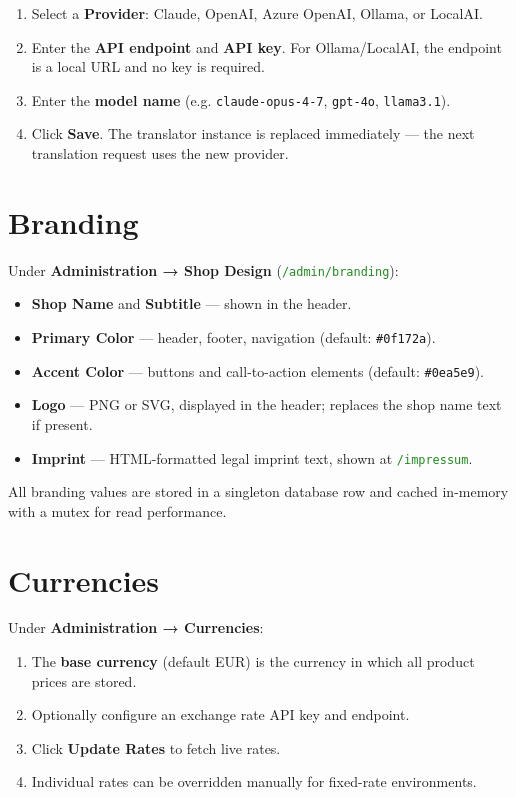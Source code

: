 \documentclass[12pt,a4paper,twoside]{report}
\newcommand{\code}[1]{\texttt{#1}}
\newcommand{\route}[1]{\texttt{\textcolor{ForestGreen}{#1}}}
\begin{document}
\begin{enumerate}
  \item Select a \textbf{Provider}: Claude, OpenAI, Azure OpenAI,
        Ollama, or LocalAI.
  \item Enter the \textbf{API endpoint} and \textbf{API key}.
        For Ollama/LocalAI, the endpoint is a local URL and no key
        is required.
  \item Enter the \textbf{model name} (e.g. \code{claude-opus-4-7},
        \code{gpt-4o}, \code{llama3.1}).
  \item Click \textbf{Save}. The translator instance is replaced
        immediately — the next translation request uses the new provider.
\end{enumerate}

\section{Branding}
\label{sec:branding}

Under \textbf{Administration → Shop Design} (\route{/admin/branding}):

\begin{itemize}
  \item \textbf{Shop Name} and \textbf{Subtitle} — shown in the header.
  \item \textbf{Primary Color} — header, footer, navigation
        (default: \code{\#0f172a}).
  \item \textbf{Accent Color} — buttons and call-to-action elements
        (default: \code{\#0ea5e9}).
  \item \textbf{Logo} — PNG or SVG, displayed in the header; replaces
        the shop name text if present.
  \item \textbf{Imprint} — HTML-formatted legal imprint text, shown at
        \route{/impressum}.
\end{itemize}

All branding values are stored in a singleton database row and cached
in-memory with a mutex for read performance.

\section{Currencies}
\label{sec:currencies}

Under \textbf{Administration → Currencies}:

\begin{enumerate}
  \item The \textbf{base currency} (default EUR) is the currency in
        which all product prices are stored.
  \item Optionally configure an exchange rate API key and endpoint.
  \item Click \textbf{Update Rates} to fetch live rates.
  \item Individual rates can be overridden manually for fixed-rate
        environments.
\end{enumerate}
\end{document}
